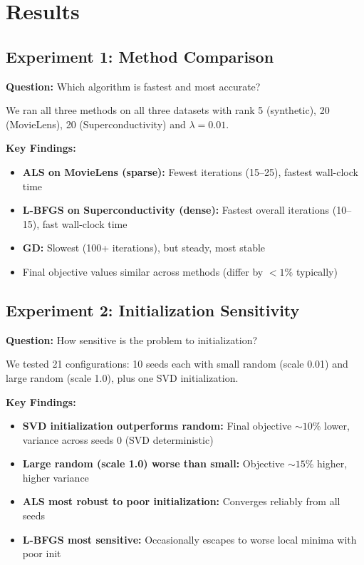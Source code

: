 \documentclass[11pt,a4paper]{article}
\begin{document}
\section{Results}

\subsection{Experiment 1: Method Comparison}

\textbf{Question:} Which algorithm is fastest and most accurate?

We ran all three methods on all three datasets with rank 5 (synthetic), 20 (MovieLens), 20 (Superconductivity) and $\lambda = 0.01$.

\textbf{Key Findings:}
\begin{itemize}
  \item \textbf{ALS on MovieLens (sparse):} Fewest iterations (15--25), fastest wall-clock time
  \item \textbf{L-BFGS on Superconductivity (dense):} Fastest overall iterations (10--15), fast wall-clock time
  \item \textbf{GD:} Slowest (100+ iterations), but steady, most stable
  \item Final objective values similar across methods (differ by $< 1\%$ typically)
\end{itemize}

\subsection{Experiment 2: Initialization Sensitivity}

\textbf{Question:} How sensitive is the problem to initialization?

We tested 21 configurations: 10 seeds each with small random (scale 0.01) and large random (scale 1.0), plus one SVD initialization.

\textbf{Key Findings:}
\begin{itemize}
  \item \textbf{SVD initialization outperforms random:} Final objective $\sim 10\%$ lower, variance across seeds 0 (SVD deterministic)
  \item \textbf{Large random (scale 1.0) worse than small:} Objective $\sim 15\%$ higher, higher variance
  \item \textbf{ALS most robust to poor initialization:} Converges reliably from all seeds
  \item \textbf{L-BFGS most sensitive:} Occasionally escapes to worse local minima with poor init
\end{itemize}
\end{document}

